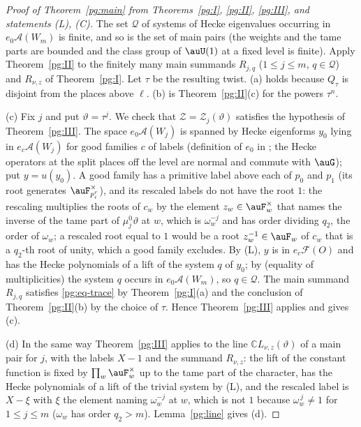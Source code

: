 \documentclass[10pt]{amsart}
\theoremstyle{definition}
\theoremstyle{remark}
\newcommand{\C}{\mathbb C}
\begin{document}
\begin{proof}[Proof of Theorem~\ref{pg:main} from Theorems~\ref{pg:I}, \ref{pg:II}, \ref{pg:III},
{\cite[Proposition~14.36]{P46}} and statements \emph{(L)}, \emph{(C)}]
The set $\mathcal Q$ of systems of Hecke eigenvalues occurring in $e_0\mathcal A(W_m)$ is finite,
and so is the set of main pairs (the weights and the tame parts are bounded and the class group
of $\auU(1)$ at a fixed level is finite). Apply Theorem~\ref{pg:II} to the finitely many main
summands $R_{j,q}$ ($1\le j\le m$, $q\in\mathcal Q$) and $R_{\nu,z}$ of Theorem~\ref{pg:I}. Let
$\tau$ be the resulting twist. (a) holds because $Q_\tau$ is disjoint from the places above
$\ell$. (b) is Theorem~\ref{pg:II}(c) for the powers $\tau^n$.

(c) Fix $j$ and put $\vartheta=\tau^j$. We check that $\mathcal Z=\mathcal Z_j(\vartheta)$
satisfies the hypothesis of Theorem~\ref{pg:III}. The space $e_0\mathcal A(W_j)$ is spanned by
Hecke eigenforms $y_0$ lying in $e_c\mathcal A(W_j)$ for good families $c$ of labels
(definition of $e_0$ in {\cite[\S14.3]{P46}}; the Hecke operators at the split places off the
level are normal and commute with $\auG$); put $y=u(y_0)$. A good family has a primitive label above each of $p_0$ and $p_1$ (its root generates
$\auF_{p_i^r}^\times$), and its rescaled labels do not have the root $1$: the rescaling multiplies
the roots of $c_w$ by the element $z_w\in\auF_w^\times$ that names the inverse of the tame part of
$\mu_j^0\vartheta$ at $w$, which is $\omega_w^{-j}$ and has order dividing $q_2$, the order of
$\omega_w$; a rescaled root equal to $1$ would be a root $z_w^{-1}\in\auF_w$ of $c_w$ that is a
$q_2$-th root of unity, which a good family excludes. By (L), $y$ is in $e_c\mathcal F(O)$ and has
the Hecke polynomials of a lift of the system $q$ of $y_0$; by {\cite[Proposition~14.36]{P46}} (equality
of multiplicities) the system $q$ occurs in $e_0\mathcal A(W_m)$, so
$q\in\mathcal Q$. The main summand $R_{j,q}$ satisfies \eqref{pg:eq-trace} by
Theorem~\ref{pg:I}(a) and the conclusion of Theorem~\ref{pg:II}(b) by the choice of $\tau$. Hence
Theorem~\ref{pg:III} applies and gives (c).

(d) In the same way Theorem~\ref{pg:III} applies to the line $\C L_{\nu,z}(\vartheta)$ of a main
pair for $j$, with the labels $X-1$ and the summand $R_{\nu,z}$: the lift of the constant
function is fixed by $\prod_w\auF_w^\times$ up to the tame part of the character, has the Hecke
polynomials of a lift of the trivial system by (L), and the rescaled label is $X-\xi$ with $\xi$
the element naming $\omega_w^{-j}$ at $w$, which is not $1$ because $\omega_w^{\,j}\ne1$ for $1\le
j\le m$ ($\omega_w$ has order $q_2>m$). Lemma~\ref{pg:line} gives (d).
\end{proof}
\end{document}
